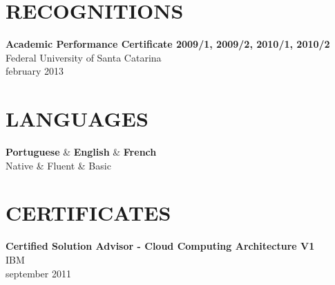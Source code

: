 \documentclass[margin=<value>,11pt]{res} %
\begin{document}
\begin{resume}
\section{RECOGNITIONS}
	{\bf Academic Performance Certificate 2009/1, 2009/2, 2010/1, 2010/2}\\
	Federal University of Santa Catarina\\
	february 2013

\section{LANGUAGES}
	\begin{ncolumn}{3}
	{\bf Portuguese} & {\bf English}        & {\bf French} \\
	Native    & Fluent & Basic  \\
	\end{ncolumn}


\section{CERTIFICATES}
{\bf Certified Solution Advisor - Cloud Computing Architecture V1}\\
IBM\\
september 2011

\end{resume} 
\end{document}
